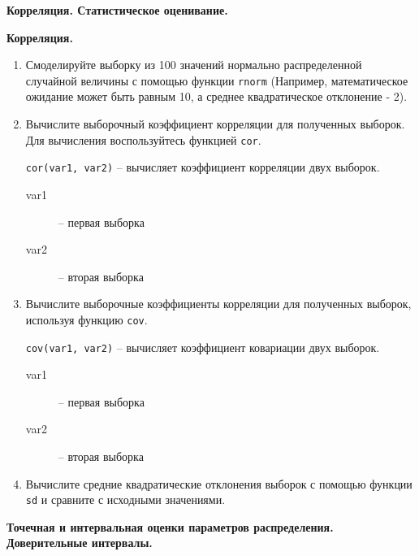 
\textbf{\large Корреляция. Статистическое оценивание.}

\textbf{Корреляция.}

\begin{enumerate}

    \item Смоделируйте выборку из 100 значений нормально распределенной случайной величины с помощью
          функции \texttt{rnorm} (Например, математическое ожидание может быть равным 10, а среднее
          квадратическое отклонение - 2).
    \item Вычислите выборочный коэффициент корреляции для полученных выборок. Для вычисления 
          воспользуйтесь функцией \texttt{cor}. 

          \begin{mdframed}[style=BadassFrame]

              \texttt{cor(var1, var2)} -- вычисляет коэффициент корреляции двух выборок. 
              \begin{description}

                \item[var1] -- первая выборка
                \item[var2] -- вторая выборка
              \end{description}
          \end{mdframed}

    \item Вычислите выборочные коэффициенты корреляции для полученных выборок, используя функцию 
          \texttt{cov}. 

          \begin{mdframed}[style=BadassFrame]

              \texttt{cov(var1, var2)} -- вычисляет коэффициент ковариации двух выборок. 
              \begin{description}

                \item[var1] -- первая выборка
                \item[var2] -- вторая выборка
              \end{description}
          \end{mdframed}

    \item Вычислите средние квадратические отклонения выборок с помощью функции \texttt{sd} и сравните
          с исходными значениями.
\end{enumerate}

\textbf{Точечная и интервальная оценки параметров распределения. Доверительные интервалы.}


